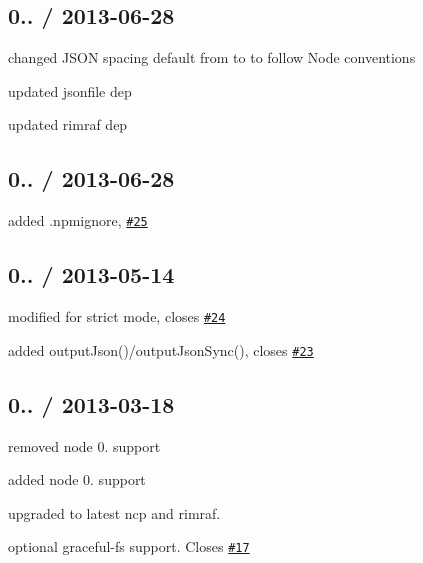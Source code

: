 \subsection*{0.. / 2013-\/06-\/28 }


\begin{DoxyItemize}
\item changed J\+S\+ON spacing default from {} to {} to follow Node conventions
\item updated {\ttfamily jsonfile} dep
\item updated {\ttfamily rimraf} dep
\end{DoxyItemize}

\subsection*{0.. / 2013-\/06-\/28 }


\begin{DoxyItemize}
\item added .npmignore, \href{https://github.com/jprichardson/node-fs-extra/pull/25}{\tt \#25}
\end{DoxyItemize}

\subsection*{0.. / 2013-\/05-\/14 }


\begin{DoxyItemize}
\item modified for {\ttfamily strict} mode, closes \href{https://github.com/jprichardson/node-fs-extra/issues/24}{\tt \#24}
\item added {\ttfamily output\+Json()/output\+Json\+Sync()}, closes \href{https://github.com/jprichardson/node-fs-extra/issues/23}{\tt \#23}
\end{DoxyItemize}

\subsection*{0.. / 2013-\/03-\/18 }


\begin{DoxyItemize}
\item removed node 0. support
\item added node 0. support
\item upgraded to latest {\ttfamily ncp} and {\ttfamily rimraf}.
\item optional {\ttfamily graceful-\/fs} support. Closes \href{https://github.com/jprichardson/node-fs-extra/issues/17}{\tt \#17}
\end{DoxyItemize}

